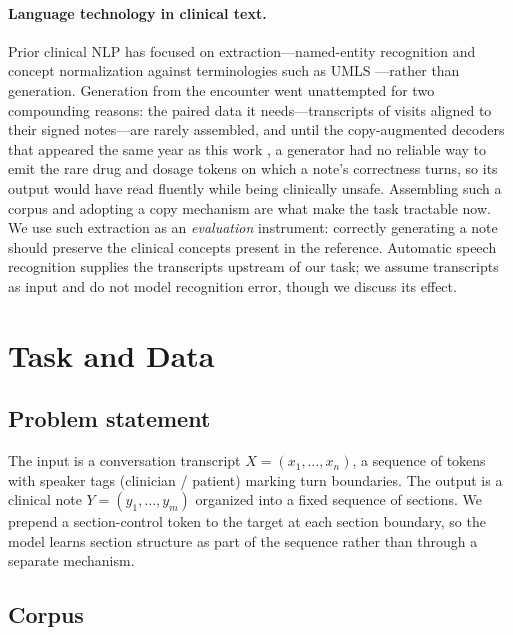 \documentclass{article}
\begin{document}
\paragraph{Language technology in clinical text.} Prior clinical NLP has focused on
extraction---named-entity recognition and concept normalization against
terminologies such as UMLS \citep{Aronson2010,Uzuner2011}---rather than generation.
Generation from the encounter went unattempted for two compounding reasons: the paired
data it needs---transcripts of visits aligned to their signed notes---are rarely
assembled, and until the copy-augmented decoders that appeared the same year as this
work \citep{Gu2016,Gulcehre2016}, a generator had no reliable way to emit the rare drug
and dosage tokens on which a note's correctness turns, so its output would have read
fluently while being clinically unsafe. Assembling such a corpus and adopting a copy
mechanism are what make the task tractable now.
We use such extraction as an \emph{evaluation} instrument: correctly generating a
note should preserve the clinical concepts present in the reference. Automatic
speech recognition supplies the transcripts upstream of our task; we assume
transcripts as input and do not model recognition error, though we discuss its
effect.

\section{Task and Data}

\subsection{Problem statement}

The input is a conversation transcript $X = (x_1, \dots, x_n)$, a sequence of tokens
with speaker tags (clinician / patient) marking turn boundaries. The output is a
clinical note $Y = (y_1, \dots, y_m)$ organized into a fixed sequence of sections.
We prepend a section-control token to the target at each section boundary, so the
model learns section structure as part of the sequence rather than through a
separate mechanism.

\subsection{Corpus}
\end{document}
